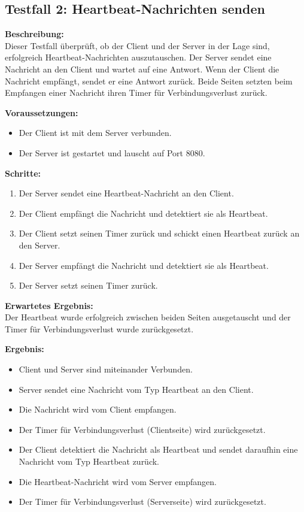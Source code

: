 \documentclass[thesis.tex]{subfiles}
\begin{document}
\subsection*{Testfall 2: Heartbeat-Nachrichten senden}

\textbf{Beschreibung:}\\
Dieser Testfall überprüft, ob der Client und der Server in der Lage sind, erfolgreich Heartbeat-Nachrichten auszutauschen. Der Server sendet eine Nachricht an den Client und wartet auf eine Antwort. Wenn der Client die Nachricht empfängt, sendet er eine Antwort zurück. Beide Seiten setzten beim Empfangen einer Nachricht ihren Timer für Verbindungsverlust zurück.

\textbf{Voraussetzungen:}
\begin{itemize}
    \item Der Client ist mit dem Server verbunden.
    \item Der Server ist gestartet und lauscht auf Port 8080.
\end{itemize}

\textbf{Schritte:}
\begin{enumerate}
    \item Der Server sendet eine Heartbeat-Nachricht an den Client.
    \item Der Client empfängt die Nachricht und detektiert sie als Heartbeat.
    \item Der Client setzt seinen Timer zurück und schickt einen Heartbeat zurück an den Server.
    \item Der Server empfängt die Nachricht und detektiert sie als Heartbeat.
    \item Der Server setzt seinen Timer zurück.
\end{enumerate}

\textbf{Erwartetes Ergebnis:}\\
Der Heartbeat wurde erfolgreich zwischen beiden Seiten ausgetauscht und der Timer für Verbindungsverlust wurde zurückgesetzt.

\textbf{Ergebnis:}
\begin{itemize}
    \item Client und Server sind miteinander Verbunden.
    \item Server sendet eine Nachricht vom Typ Heartbeat an den Client.
    \item Die Nachricht wird vom Client empfangen.
    \item Der Timer für Verbindungsverlust (Clientseite) wird zurückgesetzt.
    \item Der Client detektiert die Nachricht als Heartbeat und sendet daraufhin eine Nachricht vom Typ Heartbeat zurück.
    \item Die Heartbeat-Nachricht wird vom Server empfangen.
    \item Der Timer für Verbindungsverlust (Serverseite) wird zurückgesetzt.
\end{itemize}
\end{document}
